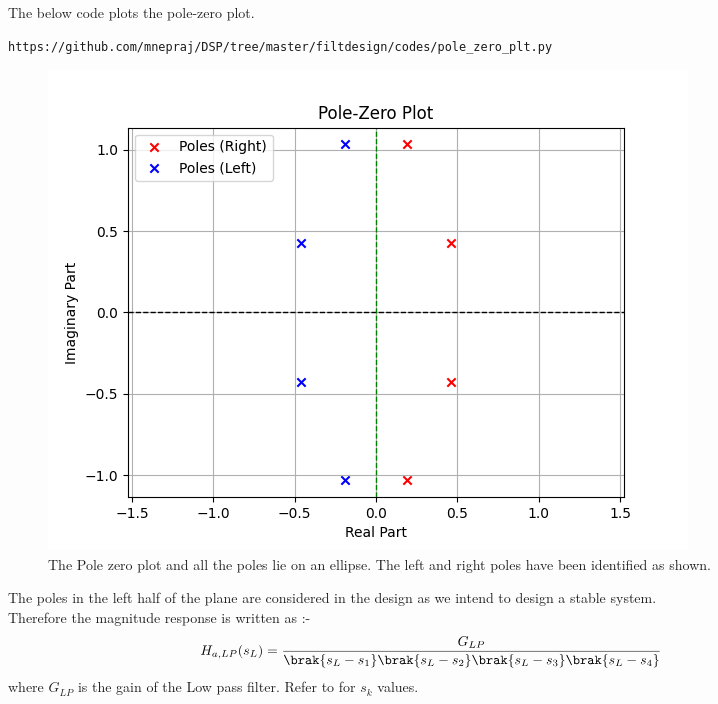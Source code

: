 \documentclass{article}
\begin{document}
\begin{enumerate}
          The below code plots the pole-zero plot.
          \begin{lstlisting}
https://github.com/mnepraj/DSP/tree/master/filtdesign/codes/pole_zero_plt.py
\end{lstlisting}
          \begin{figure}[H]
              \centering
              \includegraphics[width=1\columnwidth]{figs/Pole_Zero_plt.png}
              \caption{The Pole zero plot and all the poles lie on an ellipse. The left and right poles have been identified as shown.}
              \label{fig:pole_zero_plt}
          \end{figure}
          The poles in the left half of the plane are considered in the design as we intend to design a stable system.\\
          Therefore the magnitude response is written as :- 
          \begin{align}
              H_{a,LP}(s_L) & = \frac{G_{LP}}{\brak{s_L-s_1}\brak{s_L-s_2}\brak{s_L-s_3}\brak{s_L-s_4}}
          \end{align}
          where $G_{LP}$ is the gain of the Low pass filter. Refer to  for $s_k$ values.\\
          

\end{enumerate}
\end{document}
